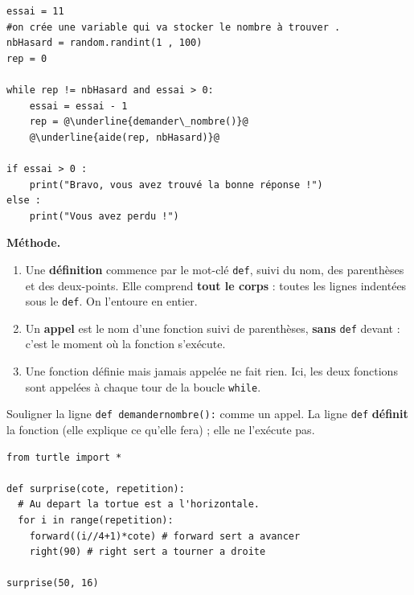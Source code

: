 \documentclass[addpoints, 11pt]{exam}
\newcommand{\methode}{\par\smallskip\noindent\textbf{Méthode.}\ }
\newcommand{\code}[1]{\texttt{#1}}
\DeclareRobustCommand{\_}{\textunderscore\allowbreak}
\begin{document}
\begin{questions}
\begin{lstlisting}[escapechar=@, numbers=none]
essai = 11
#on crée une variable qui va stocker le nombre à trouver .
nbHasard = random.randint(1 , 100)
rep = 0

while rep != nbHasard and essai > 0:
    essai = essai - 1
    rep = @\underline{demander\_nombre()}@
    @\underline{aide(rep, nbHasard)}@

if essai > 0 :
    print("Bravo, vous avez trouvé la bonne réponse !")
else :
    print("Vous avez perdu !")
\end{lstlisting}

\methode
\begin{enumerate}
  \item Une \textbf{définition} commence par le mot-clé \code{def}, suivi du nom, des parenthèses et des deux-points. Elle comprend \textbf{tout le corps} : toutes les lignes indentées sous le \code{def}. On l'entoure en entier.
  \item Un \textbf{appel} est le nom d'une fonction suivi de parenthèses, \textbf{sans} \code{def} devant : c'est le moment où la fonction s'exécute.
  \item Une fonction définie mais jamais appelée ne fait rien. Ici, les deux fonctions sont appelées à chaque tour de la boucle \code{while}.
\end{enumerate}
\begin{erreur}
Souligner la ligne \code{def demander\_nombre():} comme un appel. La ligne \code{def} \textbf{définit} la fonction (elle explique ce qu'elle fera) ; elle ne l'exécute pas.
\end{erreur}


\begin{lstlisting}
from turtle import *

def surprise(cote, repetition):
  # Au depart la tortue est a l'horizontale.
  for i in range(repetition):
    forward((i//4+1)*cote) # forward sert a avancer
    right(90) # right sert a tourner a droite

surprise(50, 16)
\end{lstlisting}


\end{questions}
\end{document}
